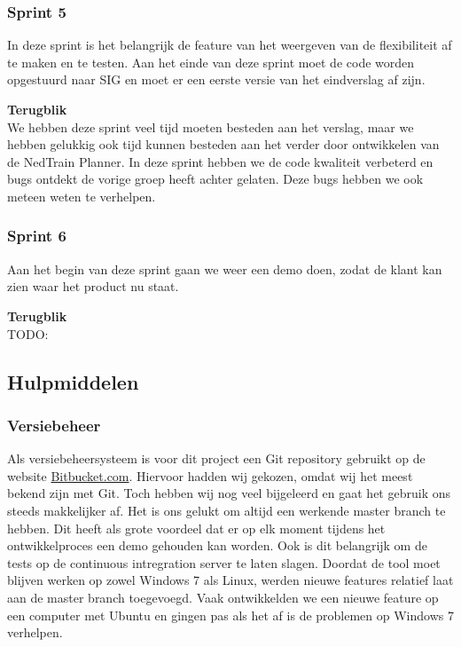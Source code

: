 \subsubsection{Sprint 5}
In deze sprint is het belangrijk de feature van het weergeven van de flexibiliteit af te maken en te testen. Aan het einde van deze sprint moet de code worden opgestuurd naar SIG en moet er een eerste versie van het eindverslag af zijn. 

\textbf{Terugblik} \\
We hebben deze sprint veel tijd moeten besteden aan het verslag, maar we hebben gelukkig ook tijd kunnen besteden aan het verder door ontwikkelen van de NedTrain Planner. In deze sprint hebben we de code kwaliteit verbeterd en bugs ontdekt de vorige groep heeft achter gelaten. Deze bugs hebben we ook meteen weten te verhelpen.

\subsubsection{Sprint 6}
Aan het begin van deze sprint gaan we weer een demo doen, zodat de klant kan zien waar het product nu staat. 

\textbf{Terugblik} \\
TODO: 

\subsection{Hulpmiddelen}
\subsubsection{Versiebeheer}
\label{subsec:versiebeheer}
Als versiebeheersysteem is voor dit project een Git repository gebruikt op de website \href{http://bitbucket.com}{Bitbucket.com}. Hiervoor hadden wij gekozen, omdat wij het meest bekend zijn met Git. Toch hebben wij nog veel bijgeleerd en gaat het gebruik ons steeds makkelijker af. Het is ons gelukt om altijd een werkende master branch te hebben. Dit heeft als grote voordeel dat er op elk moment tijdens het ontwikkelproces een demo gehouden kan worden. Ook is dit belangrijk om de tests op de continuous intregration server te laten slagen. Doordat de tool moet blijven werken op zowel Windows 7 als Linux, werden nieuwe features relatief laat aan de master branch toegevoegd. Vaak ontwikkelden we een nieuwe feature op een computer met Ubuntu en gingen pas als het af is de problemen op Windows 7 verhelpen.

